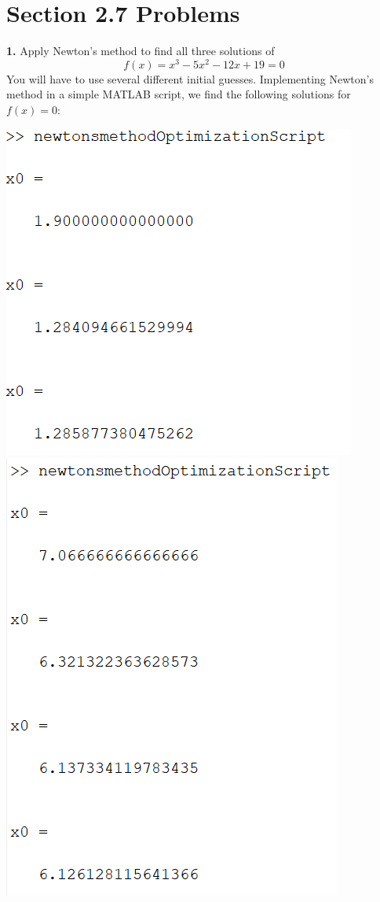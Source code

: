 \documentclass{article}
\begin{document}
    \section*{Section 2.7 Problems}
    \textbf{1.} Apply Newton's method to find all three solutions of
    \[f(x) = x^3 - 5x^2 - 12x + 19 = 0\]
    You will have to use several different initial guesses.
    \newline\newline
    Implementing Newton's method in a simple MATLAB script, we find the following solutions for $f(x) = 0$:
    \newline
    \begin{center}
        \includegraphics[scale = 0.6]{prob_2_7_1_1}
        \includegraphics[scale = 0.6]{prob_2_7_1_2}

\end{center}
\end{document}

